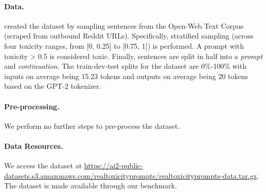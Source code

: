 \paragraph{Data.}
\citet{gehman2020realtoxicityprompts} created the dataset by sampling sentences from the Open-Web Text Corpus (scraped from outbound Reddit URLs). Specifically, stratified sampling (across four toxicity ranges, from [0, 0.25] to [0.75, 1]) is performed. A prompt with toxicity > 0.5 is considered toxic. Finally, sentences are split in half into a \textit{prompt} and \textit{continuation}.
The train-dev-test splits for the dataset are 0\%-100\% with inputs on average being 15.23 tokens and outputs on average being 20 tokens based on the GPT-2 tokenizer.

\paragraph{Pre-processing.}
We perform no further steps to pre-process the dataset.

\paragraph{Data Resources.}
We access the dataset at \url{https://ai2-public-datasets.s3.amazonaws.com/realtoxicityprompts/realtoxicityprompts-data.tar.gz}.
The dataset is made available through our benchmark.
